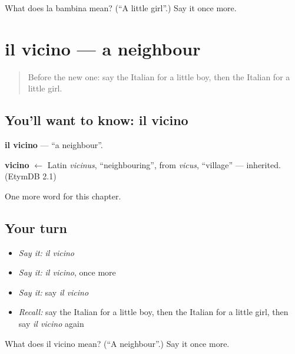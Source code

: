 \begin{tcolorbox}[breakable,colback=teal!4,colframe=teal!35!black,title={Before you move on}]
What does la bambina mean? (\textquotedblleft{}A little girl\textquotedblright{}.) Say it once more.
\end{tcolorbox}
\section[il vicino]{il vicino — a neighbour}

\label{lesson:IT-C46-vicino}



\begin{quote}
Before the new one: say the Italian for a little boy, then the Italian for a little girl.
\end{quote}

\subsection*{You'll want to know: il vicino}
\textbf{il vicino} — \textquotedblleft{}a neighbour\textquotedblright{}.

\begin{cousinweb}
\textbf{vicino} $\leftarrow$ Latin \emph{vicinus}, \textquotedblleft{}neighbouring\textquotedblright{}, from \emph{vicus}, \textquotedblleft{}village\textquotedblright{} — inherited. (EtymDB 2.1)
\end{cousinweb}

\begin{grammarlens}[title={What you've built}]
One more word for this chapter.
\end{grammarlens}

\subsection*{Your turn}
\begin{itemize}
\raggedright
  \item \emph{Say it:} \emph{il vicino}
  \item \emph{Say it:} \emph{il vicino}, once more
  \item \emph{Say it:} say \emph{il vicino}
  \item \emph{Recall:} say the Italian for a little boy, then the Italian for a little girl, then say \emph{il vicino} again
\end{itemize}

\begin{tcolorbox}[breakable,colback=teal!4,colframe=teal!35!black,title={Before you move on}]
What does il vicino mean? (\textquotedblleft{}A neighbour\textquotedblright{}.) Say it once more.
\end{tcolorbox}
